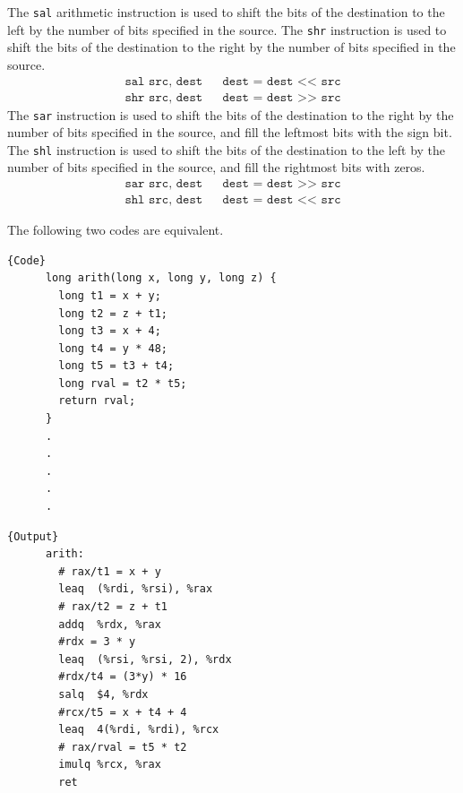   \begin{definition}
    The \texttt{sal} arithmetic instruction is used to shift the bits of the destination to the left by the number of bits specified in the source. The \texttt{shr} instruction is used to shift the bits of the destination to the right by the number of bits specified in the source.
    \begin{align*}
      \texttt{sal src, dest} && \texttt{dest = dest << src}  \\
      \texttt{shr src, dest} && \texttt{dest = dest >> src}
    \end{align*}
    The \texttt{sar} instruction is used to shift the bits of the destination to the right by the number of bits specified in the source, and fill the leftmost bits with the sign bit. The \texttt{shl} instruction is used to shift the bits of the destination to the left by the number of bits specified in the source, and fill the rightmost bits with zeros. 
    \begin{align*}
      \texttt{sar src, dest} && \texttt{dest = dest >> src}  \\
      \texttt{shl src, dest} && \texttt{dest = dest << src}
    \end{align*}
  \end{definition}

  \begin{example}
    The following two codes are equivalent. 

    \noindent\begin{minipage}{.5\textwidth}
    \begin{lstlisting}[]{Code}
      long arith(long x, long y, long z) {
        long t1 = x + y; 
        long t2 = z + t1; 
        long t3 = x + 4; 
        long t4 = y * 48; 
        long t5 = t3 + t4;
        long rval = t2 * t5; 
        return rval; 
      }
      .
      .
      .
      .
      .
    \end{lstlisting}
    \end{minipage}
    \hfill
    \begin{minipage}{.49\textwidth}
    \begin{lstlisting}[]{Output}
      arith: 
        # rax/t1 = x + y
        leaq  (%rdi, %rsi), %rax
        # rax/t2 = z + t1
        addq  %rdx, %rax
        #rdx = 3 * y 
        leaq  (%rsi, %rsi, 2), %rdx
        #rdx/t4 = (3*y) * 16
        salq  $4, %rdx 
        #rcx/t5 = x + t4 + 4
        leaq  4(%rdi, %rdi), %rcx 
        # rax/rval = t5 * t2
        imulq %rcx, %rax 
        ret 
    \end{lstlisting}
    \end{minipage}
  \end{example}

